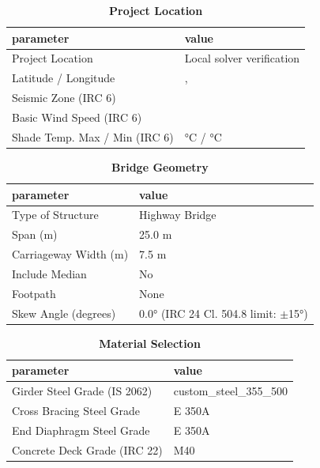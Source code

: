 \documentclass[12pt,a4paper]{report}
\numberwithin{table}{chapter}
\numberwithin{figure}{chapter}
\begin{document}
\begin{table}[H]
\caption{\textbf{Project Location}}
\label{subsec:project-location}
\begin{tabular}{|L{5.5cm}|L{8.5cm}|}
\hline
\textbf{parameter} & \textbf{value} \\
\hline
\textnormal{Project Location} & Local solver verification \\
\hline
\textnormal{Latitude / Longitude} & ,  \\
\hline
\textnormal{Seismic Zone (IRC 6)} &  \\
\hline
\textnormal{Basic Wind Speed (IRC 6)} &  \\
\hline
\textnormal{Shade Temp. Max / Min (IRC 6)} &  °C /  °C \\
\hline
\end{tabular}
\vspace{0.4cm}
\end{table}

\begin{table}[H]
\caption{\textbf{Bridge Geometry}}
\label{subsec:bridge-geometry}
\begin{tabular}{|L{5.5cm}|L{8.5cm}|}
\hline
\textbf{parameter} & \textbf{value} \\
\hline
\textnormal{Type of Structure} & Highway Bridge \\
\hline
\textnormal{Span (m)} & 25.0 m \\
\hline
\textnormal{Carriageway Width (m)} & 7.5 m \\
\hline
\textnormal{Include Median} & No \\
\hline
\textnormal{Footpath} & None \\
\hline
\textnormal{Skew Angle (degrees)} & 0.0° (IRC 24 Cl. 504.8 limit: $\pm$15°) \\
\hline
\end{tabular}
\end{table}
\vspace{0.4cm}

\begin{table}[H]
\caption{\textbf{Material Selection}}
\label{subsec:material}
\begin{tabular}{|L{5.5cm}|L{8.5cm}|}
\hline
\textbf{parameter} & \textbf{value} \\
\hline
\textnormal{Girder Steel Grade (IS 2062)} & custom\_\allowbreak{}steel\_\allowbreak{}355\_\allowbreak{}500 \\
\hline
\textnormal{Cross Bracing Steel Grade} & E 350A \\
\hline
\textnormal{End Diaphragm Steel Grade} & E 350A \\
\hline
\textnormal{Concrete Deck Grade (IRC 22)} & M40 \\
\hline
\end{tabular}
\end{table}
\vspace{0.4cm}
\end{document}
